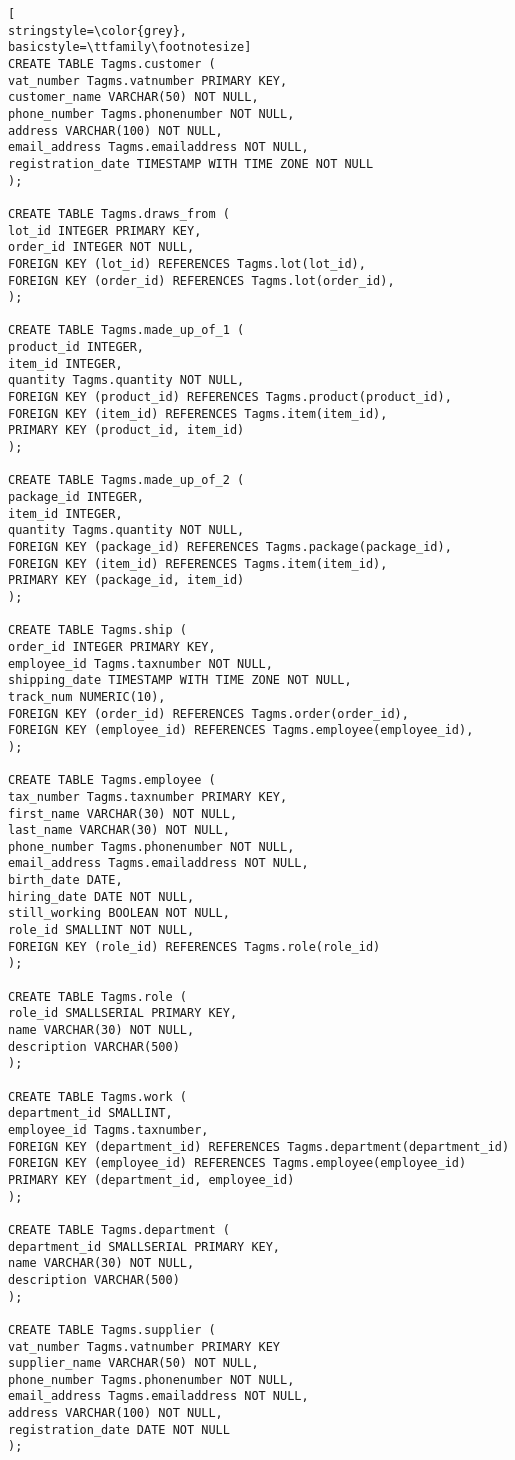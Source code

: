 \begin{lstlisting}[
stringstyle=\color{grey},
basicstyle=\ttfamily\footnotesize]
CREATE TABLE Tagms.customer (
vat_number Tagms.vatnumber PRIMARY KEY,
customer_name VARCHAR(50) NOT NULL,
phone_number Tagms.phonenumber NOT NULL,
address VARCHAR(100) NOT NULL,
email_address Tagms.emailaddress NOT NULL,
registration_date TIMESTAMP WITH TIME ZONE NOT NULL
);

CREATE TABLE Tagms.draws_from (
lot_id INTEGER PRIMARY KEY,
order_id INTEGER NOT NULL,
FOREIGN KEY (lot_id) REFERENCES Tagms.lot(lot_id),
FOREIGN KEY (order_id) REFERENCES Tagms.lot(order_id),
);

CREATE TABLE Tagms.made_up_of_1 (
product_id INTEGER,
item_id INTEGER,
quantity Tagms.quantity NOT NULL,
FOREIGN KEY (product_id) REFERENCES Tagms.product(product_id),
FOREIGN KEY (item_id) REFERENCES Tagms.item(item_id),
PRIMARY KEY (product_id, item_id)
);

CREATE TABLE Tagms.made_up_of_2 (
package_id INTEGER,
item_id INTEGER,
quantity Tagms.quantity NOT NULL,
FOREIGN KEY (package_id) REFERENCES Tagms.package(package_id),
FOREIGN KEY (item_id) REFERENCES Tagms.item(item_id),
PRIMARY KEY (package_id, item_id)
);

CREATE TABLE Tagms.ship (
order_id INTEGER PRIMARY KEY,
employee_id Tagms.taxnumber NOT NULL,
shipping_date TIMESTAMP WITH TIME ZONE NOT NULL,
track_num NUMERIC(10),
FOREIGN KEY (order_id) REFERENCES Tagms.order(order_id),
FOREIGN KEY (employee_id) REFERENCES Tagms.employee(employee_id),
);

CREATE TABLE Tagms.employee (
tax_number Tagms.taxnumber PRIMARY KEY,
first_name VARCHAR(30) NOT NULL,
last_name VARCHAR(30) NOT NULL,
phone_number Tagms.phonenumber NOT NULL,
email_address Tagms.emailaddress NOT NULL,
birth_date DATE,
hiring_date DATE NOT NULL,
still_working BOOLEAN NOT NULL,
role_id SMALLINT NOT NULL,
FOREIGN KEY (role_id) REFERENCES Tagms.role(role_id)
);

CREATE TABLE Tagms.role (
role_id SMALLSERIAL PRIMARY KEY,
name VARCHAR(30) NOT NULL,
description VARCHAR(500)
);

CREATE TABLE Tagms.work (
department_id SMALLINT,
employee_id Tagms.taxnumber,
FOREIGN KEY (department_id) REFERENCES Tagms.department(department_id)
FOREIGN KEY (employee_id) REFERENCES Tagms.employee(employee_id)
PRIMARY KEY (department_id, employee_id)
);

CREATE TABLE Tagms.department (
department_id SMALLSERIAL PRIMARY KEY,
name VARCHAR(30) NOT NULL,
description VARCHAR(500)
);

CREATE TABLE Tagms.supplier (
vat_number Tagms.vatnumber PRIMARY KEY
supplier_name VARCHAR(50) NOT NULL,
phone_number Tagms.phonenumber NOT NULL,
email_address Tagms.emailaddress NOT NULL,
address VARCHAR(100) NOT NULL,
registration_date DATE NOT NULL
);

\end{lstlisting}
